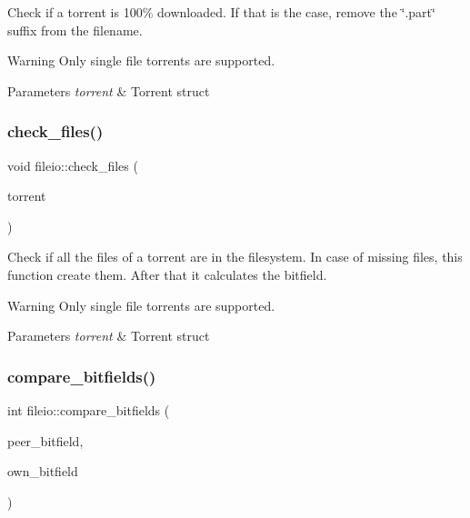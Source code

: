 Check if a torrent is 100\% downloaded. If that is the case, remove the \char`\"{}.\+part\char`\"{} suffix from the filename. 

\begin{DoxyWarning}{Warning}
Only single file torrents are supported.
\end{DoxyWarning}

\begin{DoxyParams}{Parameters}
{\em torrent} & Torrent struct \\
\hline
\end{DoxyParams}
\mbox{\label{namespacefileio_a2caefabab7dfb9c7ad57620a998a5541}} 
\subsubsection{\texorpdfstring{check\+\_\+files()}{check\_files()}}
{\footnotesize\ttfamily void fileio\+::check\+\_\+files (\begin{DoxyParamCaption}\item[{\hyperlink{structtorr_1_1Torrent}{Torrent} \&}]{torrent }\end{DoxyParamCaption})}



Check if all the files of a torrent are in the filesystem. In case of missing files, this function create them. After that it calculates the bitfield. 

\begin{DoxyWarning}{Warning}
Only single file torrents are supported.
\end{DoxyWarning}

\begin{DoxyParams}{Parameters}
{\em torrent} & Torrent struct \\
\hline
\end{DoxyParams}
\mbox{\label{namespacefileio_ae4d75e087ce78d860bef69df48a32798}} 
\subsubsection{\texorpdfstring{compare\+\_\+bitfields()}{compare\_bitfields()}}
{\footnotesize\ttfamily int fileio\+::compare\+\_\+bitfields (\begin{DoxyParamCaption}\item[{boost\+::dynamic\+\_\+bitset$<$$>$}]{peer\+\_\+bitfield,  }\item[{boost\+::dynamic\+\_\+bitset$<$$>$}]{own\+\_\+bitfield }\end{DoxyParamCaption})}



